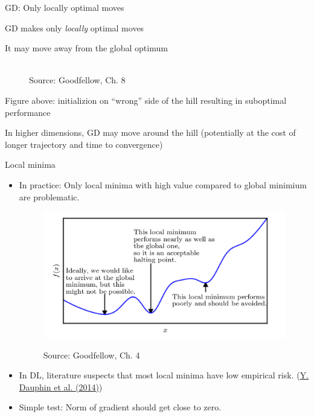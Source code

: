 \documentclass[11pt,compress,t,notes=noshow, xcolor=table]{beamer}
\begin{document}
\begin{frame} {GD: Only locally optimal moves}
\begin{itemize}
\small{
\item GD makes only \textit{locally} optimal moves
\item It may move away from the global optimum
\begin{figure}
	\centering
	\tiny{\\Source: Goodfellow, Ch. 8}
\end{figure}
\item Figure above: initializion on ``wrong'' side of the hill resulting in suboptimal performance
\item In higher dimensions, GD may move around the hill (potentially at the cost of longer trajectory and time to convergence)}
\end{itemize}
\end{frame}

\begin{vbframe} {Local minima}

\begin{itemize}
\item In practice: Only local minima with high value compared to global minimium are problematic.
\begin{figure}
\begin{center}
	\includegraphics[width=.6\textwidth]{figure_man/minima.png}
\end{center}
\tiny{Source: Goodfellow, Ch. 4}
\end{figure}
\item In DL, literature suspects that most local minima have low empirical risk. (\href{https://arxiv.org/abs/1406.2572}{Y. Dauphin et al. (2014)})
\item Simple test: Norm of gradient should get close to zero.
\end{itemize}
\end{vbframe}
\end{document}
